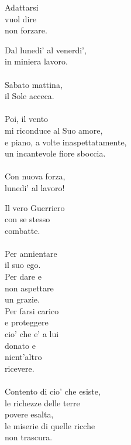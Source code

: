 \begin{haiku}
Adattarsi \\
vuol dire\\
non forzare.\\
\end{haiku}

\begin{haiku}
Dal lunedi' al venerdi',\\
in miniera lavoro.\\
\leavevmode\\
Sabato mattina,\\
il Sole acceca.\\
\leavevmode\\
Poi, il vento\\
mi riconduce al Suo amore,\\
e piano, a volte inaspettatamente,\\
un incantevole fiore sboccia.\\
\leavevmode\\
Con nuova forza,\\
lunedi' al lavoro!\\
\end{haiku}

\begin{haiku}
Il vero Guerriero\\
con se stesso\\
combatte.\\
\leavevmode\\
Per annientare \\
    il suo ego.\\
Per dare e \\
    non aspettare \\
    un grazie.\\
Per farsi carico\\
e proteggere\\
cio' che e' a lui\\
donato e\\
nient'altro \\
ricevere.\\
\leavevmode\\
Contento di cio' che esiste,\\
le richezze delle terre\\
povere esalta,\\
le miserie di quelle ricche\\
non trascura.\\
\end{haiku}

